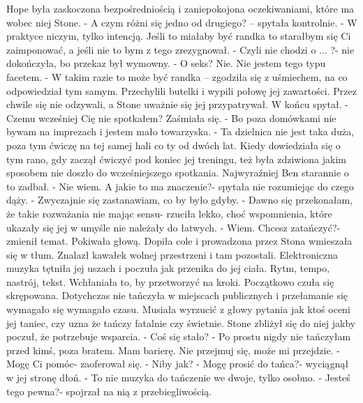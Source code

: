 \documentclass[12pt,a4paper]{book}
\begin{document}
Hope była zaskoczona bezpośredniością i zaniepokojona oczekiwaniami, które ma wobec niej Stone. 
- A czym różni się jedno od drugiego? – spytała kontrolnie.
- W praktyce niczym, tylko intencją. Jeśli to miałaby być randka to starałbym się Ci zaimponować, a jeśli nie to bym z tego zrezygnował. 
- Czyli nie chodzi o ... ?- nie dokończyła, bo przekaz był wymowny. 
- O seks? Nie. Nie jestem tego typu facetem. 
- W takim razie to może być randka – zgodziła się z uśmiechem, na co odpowiedział tym samym. 
Przechylili butelki i wypili połowę jej zawartości. 
Przez chwile się nie odzywali, a Stone uważnie się jej przypatrywał. 
W końcu spytał. 
- Czemu wcześniej Cię nie spotkałem? 
Zaśmiała się. 
- Bo poza domówkami nie bywam na imprezach i jestem mało towarzyska. 
- Ta dzielnica nie jest taka duża, poza tym ćwiczę na tej samej hali co ty od dwóch lat. 
Kiedy dowiedziała się o tym rano, gdy zaczął ćwiczyć pod koniec jej treningu, też była zdziwiona jakim sposobem nie doszło do wcześniejszego spotkania. Najwyraźniej Ben starannie o to zadbał. 
- Nie wiem. A jakie to ma znaczenie?- spytała nie rozumiejąc do czego dąży. 
- Zwyczajnie się zastanawiam, co by było gdyby. 
- Dawno się przekonałam, że takie rozważania nie mając sensu- rzuciła lekko, choć wspomnienia, które ukazały się jej w umyśle nie należały do łatwych. 
- Wiem. Chcesz zatańczyć?- zmienił temat. 
Pokiwała głową. Dopiła cole i prowadzona przez Stona wmieszała się w tłum. Znalazł kawałek wolnej przestrzeni i tam pozostali. Elektroniczna muzyka tętniła jej uszach i poczuła jak przenika do jej ciała. Rytm, tempo, nastrój, tekst. Wchłaniała to, by przetworzyć  na kroki. Początkowo czuła się skrępowana. Dotychczas nie tańczyła w miejscach publicznych i przełamanie się wymagało się wymagało czasu. Musiała wyrzucić z głowy pytania jak ktoś oceni jej taniec, czy uzna że tańczy fatalnie czy świetnie. Stone zbliżył się do niej jakby poczuł, że potrzebuje wsparcia. 
- Coś się stało?
- Po prostu nigdy nie tańczyłam przed kimś, poza bratem. Mam barierę. Nie przejmuj się, może mi przejdzie. 
- Mogę Ci pomóc- zaoferował się.
- Niby jak?
- Mogę prosić do tańca?- wyciągnął w jej stronę dłoń. 
- To nie muzyka do tańczenie we dwoje, tylko osobno.
- Jesteś tego pewna?- spojrzał na nią z przebiegliwością. 
\end{document}
